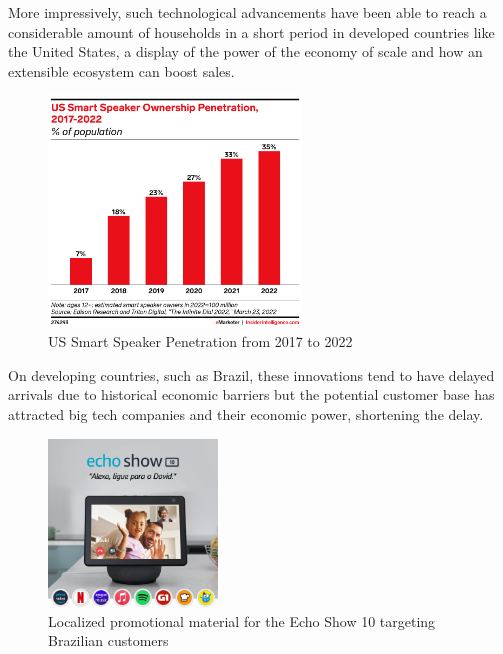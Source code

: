 \documentclass[openright]{normas-utf-tex} %
\begin{document}
More impressively, such technological advancements have been able to reach a considerable amount of households in
a short period in developed countries like the United States, a display of the power of the economy of scale and how
an extensible ecosystem can boost sales.

\begin{figure}[H]
	\centering
	\includegraphics[width=0.6\textwidth]{./images/smartspeaker.png} %
	\caption[US Smart Speaker Penetration from 2017 to 2022]{US Smart Speaker Penetration from 2017 to 2022}
	\label{fig:dummy}
\end{figure}

On developing countries, such as Brazil, these innovations tend to have delayed
arrivals due to historical economic barriers but the potential customer base
has attracted big tech companies and their economic power, shortening the
delay.

\begin{figure}[h!]
	\centering
	\includegraphics[width=0.4\textwidth]{./images/alexabr.jpg} %
	\caption[]{Localized promotional material for the Echo Show 10 targeting Brazilian customers}
	\label{fig:dummy}
\end{figure}
\end{document}
